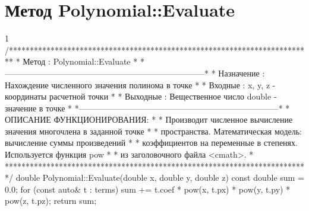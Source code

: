 \section{Метод Polynomial::Evaluate}
\footnotesize
\begin{listing}{1}
/*************************************************************************
* Метод         : Polynomial::Evaluate                                   *
*------------------------------------------------------------------------*
* Назначение    : Нахождение численного значения полинома в точке        *
* Входные       : x, y, z - координаты расчетной точки                   *
* Выходные      : Вещественное число double - значение в точке           *
*------------------------------------------------------------------------*
* ОПИСАНИЕ ФУНКЦИОНИРОВАНИЯ:                                             *
* Производит численное вычисление значения многочлена в заданной точке   *
* пространства. Математическая модель: вычисление суммы произведений     *
* коэффициентов на переменные в степенях. Используется функция pow       *
* из заголовочного файла <cmath>.                                        *
*************************************************************************/
double Polynomial::Evaluate(double x, double y, double z) const {
    double sum = 0.0;
    for (const auto& t : terms) 
        sum += t.coef * pow(x, t.px) * pow(y, t.py) * pow(z, t.pz);
    return sum;
}
\end{listing}
\normalsize

\pagebreak